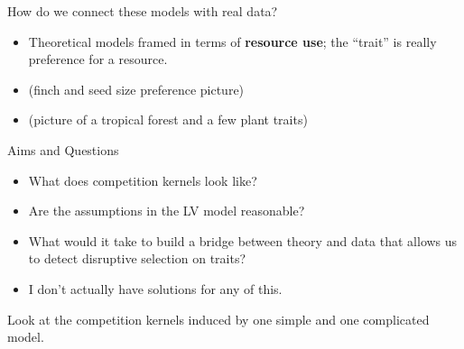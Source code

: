 \documentclass[12pt]{beamer}
\begin{document}
\begin{frame}{How do we connect these models with real data?}
  \begin{itemize}
  \item Theoretical models framed in terms of \textbf{resource use};
    the ``trait'' is really preference for a resource.
  \item (finch and seed size preference picture)
  \item (picture of a tropical forest and a few plant traits)
  \end{itemize}
\end{frame}

\begin{frame}{Aims and Questions}

  \begin{itemize}
  \item What does competition kernels look like?
  \item Are the assumptions in the LV model reasonable?
  \item What would it take to build a bridge between theory and data
    that allows us to detect disruptive selection on traits?
  \item I don't actually have solutions for any of this.
  \end{itemize}

  Look at the competition kernels induced by one simple and one
  complicated model.
\end{frame}



\end{document}
